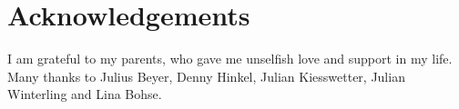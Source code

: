 \chapter*{Acknowledgements}

I am grateful to my parents, who gave me unselfish love and support in my life. Many thanks to Julius Beyer, Denny Hinkel, Julian Kiesswetter, Julian Winterling and Lina Bohse. 